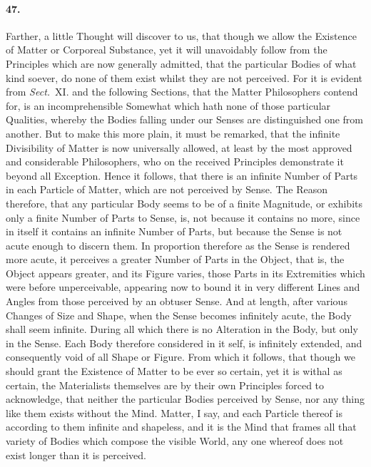 \documentclass[]{article}
\newenvironment{sectionbody}{}{}
\begin{document}
\begin{sectionbody}
\paragraph{47.} Farther, a little Thought will discover to us, that though we
allow the Existence of Matter or Corporeal Substance, yet it will
unavoidably follow from the Principles which are now generally
admitted, that the particular Bodies of what kind soever, do none
of them exist whilst they are not perceived.  For it is evident
from \emph{Sect.}~XI.  and the following Sections, that the
Matter Philosophers contend for, is an incomprehensible Somewhat
which hath none of those particular Qualities, whereby the Bodies
falling under our Senses are distinguished one from another.  But
to make this more plain, it must be remarked, that the infinite
Divisibility of Matter is now universally allowed, at least by
the most approved and considerable Philosophers, who on the
received Principles demonstrate it beyond all Exception.  Hence
it follows, that there is an infinite Number of Parts in each
Particle of Matter, which are not perceived by Sense.  The Reason
therefore, that any particular Body seems to be of a finite
Magnitude, or exhibits only a finite Number of Parts to Sense,
is, not because it contains no more, since in itself it contains
an infinite Number of Parts, but because the Sense is not acute
enough to discern them.  In proportion therefore as the Sense is
rendered more acute, it perceives a greater Number of Parts in
the Object, that is, the Object appears greater, and its Figure
varies, those Parts in its Extremities which were before
unperceivable, appearing now to bound it in very different Lines
and Angles from those perceived by an obtuser Sense.  And at
length, after various Changes of Size and Shape, when the Sense
becomes infinitely acute, the Body shall seem infinite.  During
all which there is no Alteration in the Body, but only in the
Sense.  Each Body therefore considered in it self, is infinitely
extended, and consequently void of all Shape or Figure.  From
which it follows, that though we should grant the Existence of
Matter to be ever so certain, yet it is withal as certain, the
Materialists themselves are by their own Principles forced to
acknowledge, that neither the particular Bodies perceived by
Sense, nor any thing like them exists without the Mind.  Matter,
I say, and each Particle thereof is according to them infinite
and shapeless, and it is the Mind that frames all that variety of
Bodies which compose the visible World, any one whereof does not
exist longer than it is perceived.




\end{sectionbody}
\end{document}
